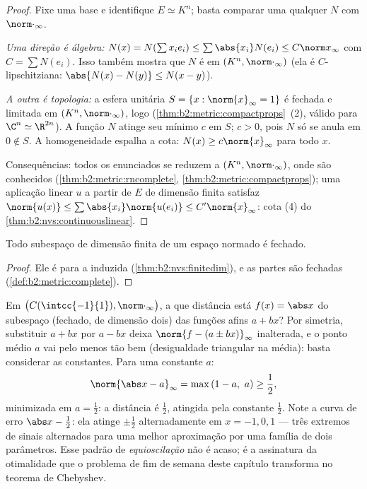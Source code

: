 \begin{proof}
Fixe uma base e identifique $E \simeq K^n$; basta comparar uma
 qualquer $N$ com $\norm\cdot_\infty$.

\emph{Uma direção é álgebra:} $N(x) = N(\sum x_i e_i) \leq
\sum \abs{x_i} N(e_i) \leq C \norm x_\infty$ com $C = \sum N(e_i)$.
Isso também mostra que $N$ é  em $(K^n, \norm\cdot_\infty)$
(ela é $C$-lipschitziana: $\abs{N(x) - N(y)} \leq N(x - y)$).

\emph{A outra é topologia:} a esfera unitária $S = \{x :
\norm{x}_\infty = 1\}$ é fechada e limitada em $(K^n,
\norm\cdot_\infty)$, logo 
(\cref{thm:b2:metric:compactprops}~(2), válido para $\C^n \simeq
\R^{2n}$). A função  $N$ atinge seu mínimo $c$ em
$S$; $c > 0$, pois $N$ só se anula em $0 \notin S$. A homogeneidade
espalha a cota: $N(x) \geq c \norm{x}_\infty$ para todo $x$.

Consequências: todos os enunciados se reduzem a $(K^n,
\norm\cdot_\infty)$, onde são conhecidos
(\cref{thm:b2:metric:rncomplete},
\cref{thm:b2:metric:compactprops}); uma aplicação linear $u$ a partir de
$E$ de dimensão finita satisfaz $\norm{u(x)} \leq \sum\abs{x_i}
\norm{u(e_i)} \leq C'\norm{x}_\infty$: cota (4) do
\cref{thm:b2:nvs:continuouslinear}.
\end{proof}

\begin{corollary}\label{cor:b2:nvs:closedsubspace}
Todo subespaço de dimensão finita de um espaço normado é fechado.
\end{corollary}

\begin{proof}
Ele é  para a  induzida
(\cref{thm:b2:nvs:finitedim}), e as partes  são fechadas
(\cref{def:b2:metric:complete}).
\end{proof}

\begin{example}\label{ex:b2:nvs:bestaffine}
Em $\bigl(C(\intcc{-1}{1}), \norm\cdot_\infty\bigr)$, a que distância está
$f(x) = \abs x$ do subespaço (fechado, de dimensão dois) das
funções afins $a + bx$? Por simetria, substituir $a + bx$ por
$a - bx$ deixa $\norm{f - (a \pm bx)}_\infty$ inalterada, e
o ponto médio $a$ vai pelo menos tão bem (desigualdade triangular na
média): basta considerar as constantes. Para uma constante
$a$:
\[
\norm{\abs x - a}_\infty = \max\,(1 - a,\ a)
\geq \frac12 ,
\]
minimizada em $a = \frac12$: a distância é $\frac12$, atingida
pela constante $\frac12$. Note a curva de erro $\abs x -
\frac12$: ela atinge $\pm\frac12$ alternadamente em $x = -1, 0,
1$ --- três extremos de sinais alternados para uma melhor
aproximação por uma família de dois parâmetros. Esse padrão de
\emph{equioscilação} não é acaso; é a
assinatura da otimalidade que o problema de fim de semana deste capítulo
transforma no teorema de Chebyshev.
\end{example}

